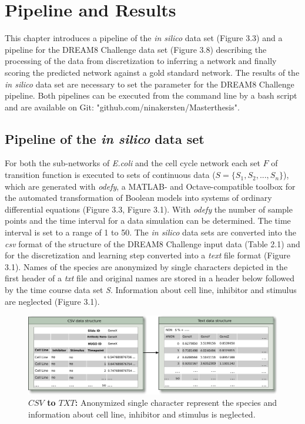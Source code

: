 \chapter{Pipeline and Results}
This chapter introduces a pipeline of the \textit{in silico} data set (Figure 3.3) and a pipeline for the DREAM8 Challenge data set (Figure 3.8) describing the processing of the data from discretization to inferring a network and finally scoring the predicted network against a gold standard network. The results of the \textit{in silico} data set are necessary to set the parameter for the DREAM8 Challenge pipeline. Both pipelines can be executed from the command line by a bash script and are available on Git: "github.com/ninakersten/Masterthesis". 

\section{Pipeline of the \textit{in silico} data set}

For both the sub-networks of \textit{E.coli} and the cell cycle network each set $F$ of transition function is executed to sets of continuous data ($S=\{ S_{1},S_{2},...,S_{n}\} $), which are generated with \textit{odefy}, a MATLAB- and Octave-compatible toolbox for the automated transformation of Boolean models into systems of ordinary differential equations %
(Figure 3.3, Figure 3.1). With \textit{odefy} the number of sample points and the time interval for a data simulation can be determined. The time interval is set to a range of 1 to 50. The \textit{in silico} data sets are converted into the \textit{csv} format of the structure of the DREAM8 Challenge input data (Table 2.1) and for the discretization and learning step converted into a \textit{text} file format (Figure 3.1). Names of the species are anonymized by single characters depicted in the first header of a \textit{txt} file and original names are stored in a header below followed by the time course data set \textit{S}. Information about cell line, inhibitor and stimulus are neglected (Figure 3.1).


\begin{figure}[H]
\captionsetup{width=0.9\linewidth}
\centering
\includegraphics[width=1.0\textwidth]{./Bilder/CSV2TXT.pdf}
\caption[$CSV$ to $TXT$]{\textbf{$CSV$ to $TXT$:} Anonymized single character represent the species and information about cell line, inhibitor and stimulus is neglected. }
\label{fig:9}
\end{figure}


